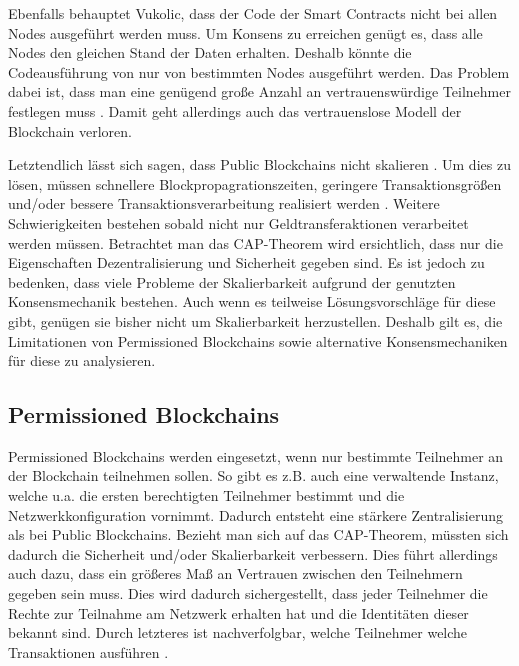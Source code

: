 Ebenfalls behauptet Vukolic, dass der Code der Smart Contracts nicht bei allen Nodes ausgeführt werden muss. Um Konsens zu erreichen genügt es, dass alle Nodes den gleichen Stand der Daten erhalten. Deshalb könnte die Codeausführung von nur von bestimmten Nodes ausgeführt werden. Das Problem dabei ist, dass man eine genügend große Anzahl an vertrauenswürdige Teilnehmer festlegen muss \cite{VukolicRethinkingPermissionedBlockchains2017}. Damit geht allerdings auch das vertrauenslose Modell der Blockchain verloren.

Letztendlich lässt sich sagen, dass Public Blockchains nicht skalieren . Um dies zu lösen, müssen  schnellere Blockpropagrationszeiten, geringere Transaktionsgrößen und/oder bessere Transaktionsverarbeitung realisiert werden \cite{SchererPerformanceScalabilityBlockchain2017}. Weitere Schwierigkeiten bestehen sobald nicht nur Geldtransferaktionen verarbeitet werden müssen. Betrachtet man das CAP-Theorem wird ersichtlich, dass nur die Eigenschaften Dezentralisierung und Sicherheit gegeben sind. Es ist jedoch zu bedenken, dass viele Probleme der Skalierbarkeit aufgrund der genutzten Konsensmechanik bestehen. Auch wenn es teilweise Lösungsvorschläge für diese gibt, genügen sie bisher nicht um Skalierbarkeit herzustellen. Deshalb gilt es, die Limitationen von Permissioned Blockchains sowie alternative Konsensmechaniken für diese zu analysieren.


\subsection{Permissioned Blockchains}
Permissioned Blockchains werden eingesetzt, wenn nur bestimmte Teilnehmer an der Blockchain teilnehmen sollen. So gibt es z.B. auch eine verwaltende Instanz, welche u.a. die ersten berechtigten Teilnehmer bestimmt und die Netzwerkkonfiguration vornimmt. Dadurch entsteht eine stärkere Zentralisierung als bei Public Blockchains. Bezieht man sich auf das CAP-Theorem, müssten sich dadurch die Sicherheit und/oder Skalierbarkeit verbessern. Dies führt allerdings auch dazu, dass ein größeres Maß an Vertrauen zwischen den Teilnehmern gegeben sein muss. Dies wird dadurch sichergestellt, dass jeder Teilnehmer die Rechte zur Teilnahme am Netzwerk erhalten hat und die Identitäten dieser bekannt sind. Durch letzteres ist nachverfolgbar, welche Teilnehmer welche Transaktionen ausführen \cite{SchererPerformanceScalabilityBlockchain2017}.

